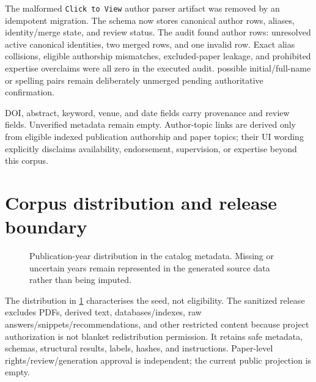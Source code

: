 The malformed \texttt{Click to View} author parser artifact was removed by an idempotent migration. The schema now stores canonical author rows, aliases, identity/merge state, and review status. The audit found \RawAuthorRowCount{} author rows: \CanonicalAuthorCount{} unresolved active canonical identities, two merged rows, and one invalid row. Exact alias collisions, eligible authorship mismatches, excluded-paper leakage, and prohibited expertise overclaims were all zero in the executed audit. \PossibleAuthorMergeCount{} possible initial/full-name or spelling pairs remain deliberately unmerged pending authoritative confirmation.

DOI, abstract, keyword, venue, and date fields carry provenance and review fields. Unverified metadata remain empty. Author-topic links are derived only from eligible indexed publication authorship and paper topics; their UI wording explicitly disclaims availability, endorsement, supervision, or expertise beyond this corpus.

\section{Corpus distribution and release boundary}

\begin{figure}[htbp]
\centering

\caption[Publication-year distribution in catalog metadata.]{Publication-year distribution in the catalog metadata. Missing or uncertain years remain represented in the generated source data rather than being imputed.}
\label{fig:years}
\end{figure}

The distribution in \cref{fig:years} characterises the seed, not eligibility. The sanitized release excludes PDFs, derived text, databases/indexes, raw answers/snippets/recommendations, and other restricted content because project authorization is not blanket redistribution permission. It retains safe metadata, schemas, structural results, labels, hashes, and instructions. Paper-level rights/review/generation approval is independent; the current public projection is empty.
